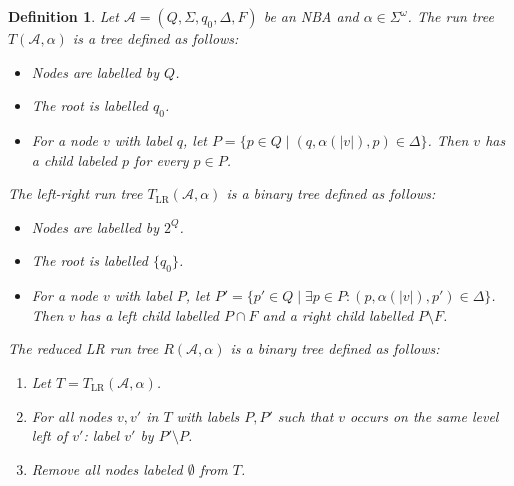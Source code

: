 \documentclass{article}
\newtheorem{definition}{Definition}
\begin{document}
\vspace{1cm}
\begin{definition}
	Let $\mathcal{A} = (Q, \Sigma, q_0, \Delta, F)$ be an NBA and $\alpha \in \Sigma^\omega$. The run tree $T(\mathcal{A}, \alpha)$ is a tree defined as follows:
	\begin{itemize}
		\item Nodes are labelled by $Q$.
		\item The root is labelled $q_0$.
		\item For a node $v$ with label $q$, let $P = \{ p \in Q \mid (q, \alpha(|v|), p) \in \Delta \}$. Then $v$ has a child labeled $p$ for every $p \in P$.
	\end{itemize}
	
	The left-right run tree $T_\text{LR}(\mathcal{A}, \alpha)$ is a binary tree defined as follows:
	\begin{itemize}
		\item Nodes are labelled by $2^Q$.
		\item The root is labelled $\{q_0\}$.
		\item For a node $v$ with label $P$, let $P' = \{ p' \in Q \mid \exists p \in P: (p, \alpha(|v|), p') \in \Delta \}$. Then $v$ has a left child labelled $P \cap F$ and a right child labelled $P \setminus F$.
	\end{itemize}
	
	The reduced LR run tree $R(\mathcal{A}, \alpha)$ is a binary tree defined as follows:
	\begin{enumerate}
		\item Let $T = T_\text{LR}(\mathcal{A}, \alpha)$.
		\item For all nodes $v, v'$ in $T$ with labels $P, P'$ such that $v$ occurs on the same level left of $v'$: label $v'$ by $P' \setminus P$.
		\item Remove all nodes labeled $\emptyset$ from $T$.
	\end{enumerate}
	

\end{definition}
\end{document}
